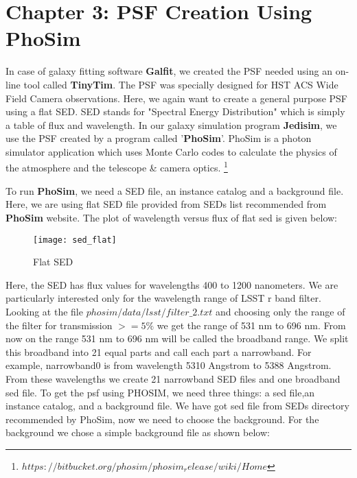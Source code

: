%
%
%
%
\section{Chapter 3: PSF Creation Using PhoSim}\label{sec:chap3}
In case of galaxy fitting software \textbf{Galfit}, we created the PSF needed using an on-line tool called \textbf{TinyTim}. The PSF was specially designed for HST ACS Wide Field Camera observations. Here, we again want to create a general purpose PSF using a flat SED. SED stands for "Spectral Energy Distribution" which is simply a table of flux and wavelength. In our galaxy simulation program \textbf{Jedisim}, we use the PSF created by a program called '\textbf{PhoSim}'. PhoSim is a photon simulator application which uses Monte Carlo codes to calculate the physics of the atmosphere and the telescope \& camera optics. \footnote{$https://bitbucket.org/phosim/phosim_release/wiki/Home$}

To run \textbf{PhoSim}, we need a SED file, an instance catalog and a background file. Here, we are using flat SED file provided from SEDs list recommended from \textbf{PhoSim} website.
The plot of wavelength versus flux of flat sed is given below:
  \begin{figure}[ht!]
      \centering
      \texttt{[image: sed\_flat]}
      \caption{Flat SED}
      \label{[fig:sed_flat]}
  \end{figure}

Here, the SED has flux values for wavelengths 400 to 1200 nanometers.
We are particularly interested only for the wavelength range of LSST r band filter. Looking at the file $phosim/data/lsst/filter\_2.txt$ and choosing only the range of the filter for transmission $>=5\%$ we get the range of 531 nm to 696 nm. From now on the range 531 nm to 696 nm will be called the
broadband range. We split this broadband into 21 equal parts and call each part a narrowband. For example, narrowband0 is from wavelength 5310 Angstrom to 5388 Angstrom. From these wavelengths we create 21 narrowband SED files and one broadband sed file. To get the psf using PHOSIM, we need three things: a sed file,an instance catalog, and a background file. We have got sed file from SEDs directory recommended by PhoSim, now we need to choose the background. For the background we chose a simple background file as shown below: 


